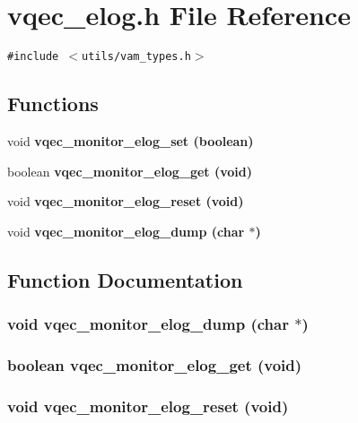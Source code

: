 \section{vqec\_\-elog.h File Reference}
\label{vqec__elog_8h}
{\tt \#include $<$utils/vam\_\-types.h$>$}\par
\subsection*{Functions}
\begin{CompactItemize}
\item 
void \bf{vqec\_\-monitor\_\-elog\_\-set} (boolean)
\item 
boolean \bf{vqec\_\-monitor\_\-elog\_\-get} (void)
\item 
void \bf{vqec\_\-monitor\_\-elog\_\-reset} (void)
\item 
void \bf{vqec\_\-monitor\_\-elog\_\-dump} (char $\ast$)
\end{CompactItemize}


\subsection{Function Documentation}
\subsubsection{\setlength{\rightskip}{0pt plus 5cm}void vqec\_\-monitor\_\-elog\_\-dump (char $\ast$)}\label{vqec__elog_8h_e5795c7350a7276c2568ae9ebf11f958}


\subsubsection{\setlength{\rightskip}{0pt plus 5cm}boolean vqec\_\-monitor\_\-elog\_\-get (void)}\label{vqec__elog_8h_031251457270a9e9e5511df6ba9ddce4}


\subsubsection{\setlength{\rightskip}{0pt plus 5cm}void vqec\_\-monitor\_\-elog\_\-reset (void)}\label{vqec__elog_8h_e57b6c195569165b0bc419b4d2cb1fba}


